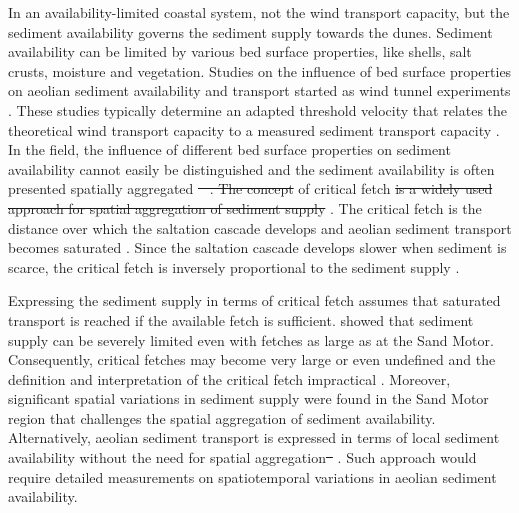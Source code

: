 \documentclass[preprint,12pt,authoryear,a4paper]{elsarticle}
\providecommand{\DIFadd}[1]{{\protect\color{blue}\uwave{#1}}} %
\providecommand{\DIFdel}[1]{{\protect\color{red}\sout{#1}}}                      %
\providecommand{\DIFaddbegin}{} %
\providecommand{\DIFaddend}{} %
\providecommand{\DIFdelbegin}{} %
\providecommand{\DIFdelend}{} %
\begin{document}
In an availability-limited coastal system, not the wind transport
capacity, but the sediment availability governs the sediment supply
towards the dunes. Sediment availability can be limited by various bed
surface properties, like shells, salt crusts, moisture and
vegetation. Studies on the influence of bed surface properties on
aeolian sediment availability and transport started as wind tunnel
experiments \citep[e.g.][]{Belly1964, Howard1977, Dyer1986,
  Gillette1989}. These studies typically determine an adapted
threshold velocity that relates the theoretical wind transport
capacity to a measured sediment transport capacity
\citep{Bagnold1937b}. In the field, the influence of different bed
surface properties on sediment availability cannot easily be
distinguished and the sediment availability is often presented
spatially aggregated \DIFdelbegin \DIFdel{\mbox{%
\citep{Jackson1998, Arens2001, Wiggs2004}}%
. The
concept }\DIFdelend \DIFaddbegin \DIFadd{sediment supply in terms }\DIFaddend of critical fetch
\DIFdelbegin \DIFdel{is a widely used approach for spatial
aggregation of sediment supply }\DIFdelend \citep[e.g.][]{Jackson1999, DavidsonArnott2005, DavidsonArnott2008,
  Bauer2009}. The critical fetch is the distance over which the
saltation cascade develops and aeolian sediment transport becomes
saturated \citep{Bauer2002}. Since the saltation cascade develops
slower when sediment is scarce, the critical fetch is inversely
proportional to the sediment supply \citep{DelgadoFernandez2010}.

Expressing the sediment supply in terms of critical fetch assumes that
saturated transport is reached if the available fetch is
sufficient. \citet{Hoonhout2017a} showed that sediment supply can be
severely limited even with fetches as large as at the Sand
Motor. Consequently, critical fetches may become very large or even
undefined and the definition and interpretation of the critical fetch
impractical \citep{Lynch2016, deVries2014b}. Moreover, significant
spatial variations in sediment supply were found in the Sand Motor
region that challenges the spatial aggregation of sediment
availability. Alternatively, aeolian sediment transport is expressed
in terms of local sediment availability without the need for spatial
aggregation\DIFdelbegin \DIFdel{\mbox{%
\citep{deVries2014a, Hoonhout2016}}%
}\DIFdelend . Such approach would require detailed measurements on
spatiotemporal variations in aeolian sediment availability.
\end{document}
